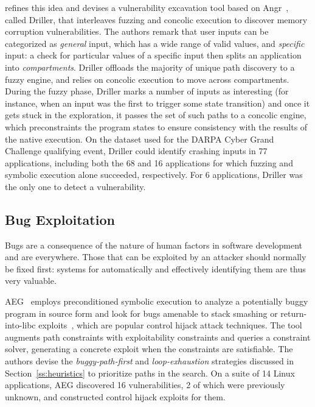 \cite{DRILLER-NDSS16} refines this idea and devises a vulnerability excavation tool based on {\sc Angr}~\cite{ANGR-SSP16}, called Driller, that interleaves fuzzing and concolic execution to discover memory corruption vulnerabilities. The authors remark that user inputs can be categorized as {\em general} input, which has a wide range of valid values, and {\em specific} input: a check for particular values of a specific input then splits an application into {\em compartments}. Driller offloads the majority of unique path discovery to a fuzzy engine, and relies on concolic execution to move across compartments. During the fuzzy phase, Driller marks a number of inputs as interesting (for instance, when an input was the first to trigger some state transition) and once it gets stuck in the exploration, it passes the set of such paths to a concolic engine, which preconstraints the program states to ensure consistency with the results of the native execution. On the dataset used for the DARPA Cyber Grand Challenge qualifying event, Driller could identify crashing inputs in 77 applications, including both the 68 and 16 applications for which fuzzing and symbolic execution alone succeeded, respectively. For 6 applications, Driller was the only one to detect a vulnerability.


\subsection{Bug Exploitation}
\label{ss:bug-exploitation}
Bugs are a consequence of the nature of human factors in software development and are everywhere. Those that can be exploited by an attacker should normally be fixed first: systems for automatically and effectively identifying them are thus very valuable.

{\sc AEG}~\cite{AEG-NDSS11} employs preconditioned symbolic execution to analyze a potentially buggy program in source form and look for bugs amenable to stack smashing or return-into-libc exploits~\cite{PB-SSP04}, which are popular control hijack attack techniques. The tool augments path constraints with exploitability constraints and queries a constraint solver, generating a concrete exploit when the constraints are satisfiable. The authors devise the {\em buggy-path-first} and {\em loop-exhaustion} strategies discussed in Section~\ref{ss:heuristics} to prioritize paths in the search. On a suite of 14 Linux applications, {\sc AEG} discovered 16 vulnerabilities, 2 of which were previously unknown, and constructed control hijack exploits for them.

